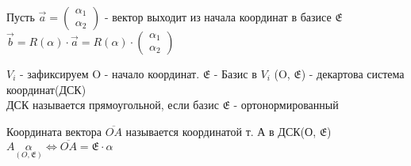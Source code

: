 \begin{exercise}
Пусть $\vec{a} = \begin{pmatrix}
	\alpha_1 \\
	\alpha_2
\end{pmatrix}$ - вектор выходит из начала координат в базисе \(\mathfrak{E}\) $\vec{b} = R(\alpha)\cdot\vec{a} = R(\alpha) \cdot\begin{pmatrix}
	\alpha_1 \\
	\alpha_2
\end{pmatrix}$
\end{exercise}
\(V_i\) - зафиксируем O - начало координат. \(\mathfrak{E}\) - Базис в $V_i$ (O, $\mathfrak{E}$) - декартова система координат(ДСК) \\
ДСК называется прямоугольной, если базис \(\mathfrak{E}\) - ортонормированный
\begin{definition}
Координата вектора $\overline{OA}$ называется координатой т. А в ДСК(О, $\mathfrak{E}$) \\
\(A\underset{(O, \mathfrak{E})}{\alpha}\Longleftrightarrow \overline{OA} = \mathfrak{E}\cdot\alpha\)
\end{definition}

